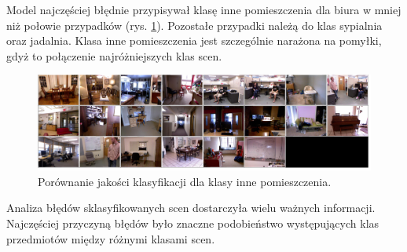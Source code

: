 Model najczęściej błędnie przypisywał klasę inne pomieszczenia dla biura w mniej niż połowie przypadków (rys. \ref{fig:oter_indoor-false-pred}). Pozostałe przypadki należą do klas sypialnia oraz jadalnia. Klasa inne pomieszczenia jest szczególnie narażona na pomyłki, gdyż to połączenie najróżniejszych klas scen.
\begin{figure}[ht!]
    \centering
    \includegraphics[width=\textwidth]{img/preds_analysis/classification/other_indoor-2.png}
    \caption{Porównanie jakości klasyfikacji dla klasy inne pomieszczenia.}
    \label{fig:oter_indoor-false-pred}
\end{figure}


Analiza błędów sklasyfikowanych scen dostarczyła wielu ważnych informacji. Najczęściej przyczyną błędów było znaczne podobieństwo występujących klas przedmiotów między różnymi klasami scen.


    
    
    
